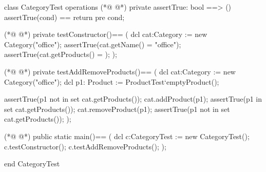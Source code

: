 \begin{vdmpp}[breaklines=true]
class CategoryTest
 operations
(*@
\label{assertTrue:3}
@*)
  private assertTrue: bool ==> ()
    assertTrue(cond) == return
    pre cond;
    
(*@
\label{testConstructor:7}
@*)
  private testConstructor()==
  (
   dcl cat:Category := new Category("office");
   assertTrue(cat.getName() = "office");
   assertTrue(cat.getProducts() = {});
  );
  
(*@
\label{testAddRemoveProducts:14}
@*)
  private testAddRemoveProducts()==
  (
   dcl cat:Category := new Category("office");
   dcl p1: Product := ProductTest`emptyProduct();
   
   assertTrue(p1 not in set cat.getProducts());
   cat.addProduct(p1);
   assertTrue(p1 in set cat.getProducts());
   cat.removeProduct(p1);
   assertTrue(p1 not in set cat.getProducts());
  );
  
(*@
\label{main:26}
@*)
  public static main()==
    (
   dcl c:CategoryTest := new CategoryTest();
   c.testConstructor();
   c.testAddRemoveProducts();
    );
     
end CategoryTest
\end{vdmpp}
